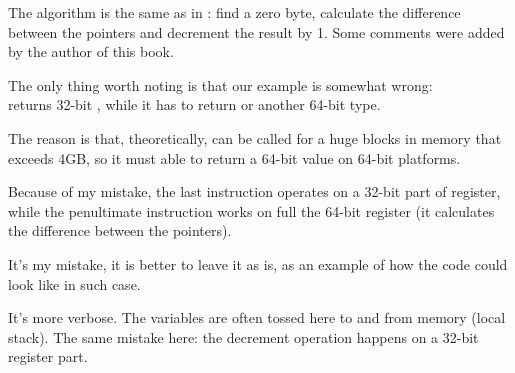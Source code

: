 ﻿




The algorithm is the same as in : 
find a zero 
byte, calculate the difference between the pointers and decrement the result by 1.
Some comments were added by the author of this book.

The only thing worth noting is that our example is somewhat wrong: \\
 returns 32-bit \Tint, while it has to return  or another 64-bit type.

The reason is that, theoretically,  can be called for a huge blocks in memory that exceeds
4GB, so it must able to return a 64-bit value on 64-bit platforms.

Because of my mistake, the last \SUB instruction operates on a 32-bit part of register, while the penultimate
\SUB instruction works on full the 64-bit register (it calculates the difference between the pointers).

It's my mistake, it is better to leave it as is, as an example of how the code could look like in such case.




It's more verbose.
The variables are often tossed here to and from memory (local stack).
The same mistake here: the decrement operation happens on a 32-bit register part.

